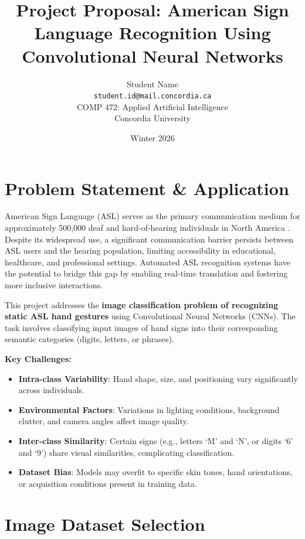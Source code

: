 \documentclass[11pt,a4paper]{article}
\title{\textbf{Project Proposal: American Sign Language Recognition Using Convolutional Neural Networks}}
\author{
    Student Name\\
    \texttt{student.id@mail.concordia.ca}\\
    COMP 472: Applied Artificial Intelligence\\
    Concordia University
}
\date{Winter 2026}
\begin{document}
\maketitle

\section{Problem Statement \& Application}

American Sign Language (ASL) serves as the primary communication medium for approximately 500,000 deaf and hard-of-hearing individuals in North America \cite{mitchell2006}. Despite its widespread use, a significant communication barrier persists between ASL users and the hearing population, limiting accessibility in educational, healthcare, and professional settings. Automated ASL recognition systems have the potential to bridge this gap by enabling real-time translation and fostering more inclusive interactions.

This project addresses the \textbf{image classification problem of recognizing static ASL hand gestures} using Convolutional Neural Networks (CNNs). The task involves classifying input images of hand signs into their corresponding semantic categories (digits, letters, or phrases).

\textbf{Key Challenges:}
\begin{itemize}[noitemsep,topsep=2pt]
    \item \textbf{Intra-class Variability}: Hand shape, size, and positioning vary significantly across individuals.
    \item \textbf{Environmental Factors}: Variations in lighting conditions, background clutter, and camera angles affect image quality.
    \item \textbf{Inter-class Similarity}: Certain signs (e.g., letters `M' and `N', or digits `6' and `9') share visual similarities, complicating classification.
    \item \textbf{Dataset Bias}: Models may overfit to specific skin tones, hand orientations, or acquisition conditions present in training data.
\end{itemize}

\section{Image Dataset Selection}
\end{document}
